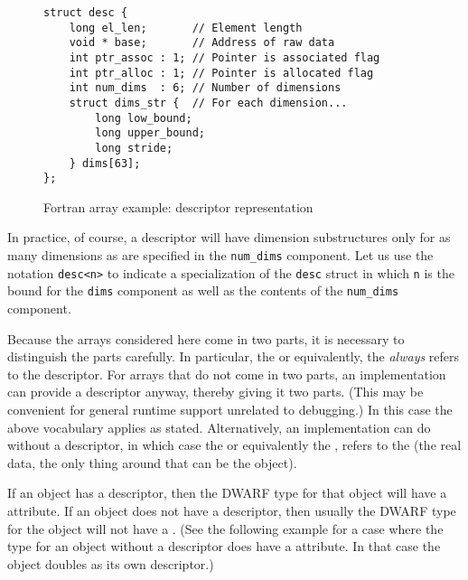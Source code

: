 \begin{figure}[here]
\begin{lstlisting}
struct desc {
    long el_len;       // Element length
    void * base;       // Address of raw data
    int ptr_assoc : 1; // Pointer is associated flag
    int ptr_alloc : 1; // Pointer is allocated flag
    int num_dims  : 6; // Number of dimensions
    struct dims_str {  // For each dimension...  
        long low_bound;
        long upper_bound;
        long stride;
    } dims[63];
};
\end{lstlisting}
\caption{Fortran array example: descriptor representation}
\label{fig:fortranarrayexampledescriptorrepresentation}
\end{figure}


In practice, of course, a  descriptor will have
dimension substructures only for as many dimensions as are
specified in the \texttt{num\_dims} component. Let us use the notation
\texttt{desc\textless n\textgreater}   
to indicate a specialization of the \texttt{desc} struct in
which \texttt{n} is the bound for the \texttt{dims} component as well as the
contents of the \texttt{num\_dims} component.

Because the arrays considered here come in two parts, it is
necessary to distinguish the parts carefully. In particular,
the  or equivalently, the  \emph{always} refers to the descriptor. For
arrays that do not come in two parts, an implementation can
provide a descriptor anyway, thereby giving it two parts. (This
may be convenient for general runtime support unrelated to
debugging.) In this case the above vocabulary applies as
stated. Alternatively, an implementation can do without a
descriptor, in which case the 
or equivalently the , refers
to the  (the real data, the only thing around
that can be the object).

If an object has a descriptor, then the DWARF type for that
object will have a 
attribute. If an object
does not have a descriptor, then usually the DWARF type for the
object will not have a 
. 
(See the following
 example for a case where the type for an object without
a descriptor does have a 
 attribute. In
that case the object doubles as its own descriptor.)

